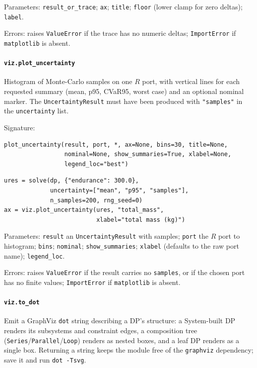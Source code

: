\documentclass[11pt,a4paper]{article}
\begin{document}
Parameters: \texttt{result\_or\_trace}; \texttt{ax}; \texttt{title};
\texttt{floor} (lower clamp for zero deltas); \texttt{label}.

Errors: raises \texttt{ValueError} if the trace has no numeric deltas;
\texttt{ImportError} if \texttt{matplotlib} is absent.

\paragraph{\texttt{viz.plot\_uncertainty}}\label{ref:viz:plot_uncertainty}
Histogram of Monte-Carlo samples on one $R$ port, with vertical lines for
each requested summary (mean, p95, CVaR95, worst case) and an optional
nominal marker. The \texttt{UncertaintyResult} must have been produced with
\texttt{"samples"} in the \texttt{uncertainty} list.

Signature:
\begin{lstlisting}
plot_uncertainty(result, port, *, ax=None, bins=30, title=None,
                 nominal=None, show_summaries=True, xlabel=None,
                 legend_loc="best")
\end{lstlisting}

\begin{lstlisting}
ures = solve(dp, {"endurance": 300.0},
             uncertainty=["mean", "p95", "samples"],
             n_samples=200, rng_seed=0)
ax = viz.plot_uncertainty(ures, "total_mass",
                          xlabel="total mass (kg)")
\end{lstlisting}

Parameters: \texttt{result} an \texttt{UncertaintyResult} with samples;
\texttt{port} the $R$ port to histogram; \texttt{bins}; \texttt{nominal};
\texttt{show\_summaries}; \texttt{xlabel} (defaults to the raw port name);
\texttt{legend\_loc}.

Errors: raises \texttt{ValueError} if the result carries no \texttt{samples},
or if the chosen port has no finite values; \texttt{ImportError} if
\texttt{matplotlib} is absent.

\paragraph{\texttt{viz.to\_dot}}\label{ref:viz:to_dot}
Emit a GraphViz \texttt{dot} string describing a DP's structure: a
System-built DP renders its subsystems and constraint edges, a composition
tree (\texttt{Series}/\texttt{Parallel}/\texttt{Loop}) renders as nested
boxes, and a leaf DP renders as a single box. Returning a string keeps the
module free of the \texttt{graphviz} dependency; save it and run
\texttt{dot -Tsvg}.
\end{document}
